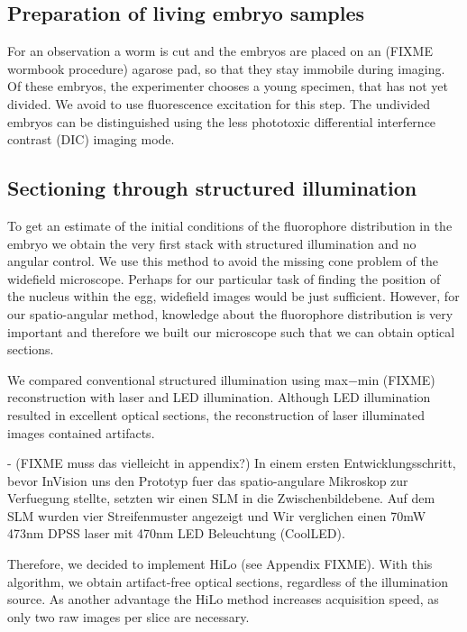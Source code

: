 \subsection{Preparation of living embryo samples} 
For an observation a worm is cut and the embryos are placed on an
(FIXME wormbook procedure) agarose pad, so that they stay immobile
during imaging. Of these embryos, the experimenter chooses a young
specimen, that has not yet divided. We avoid to use fluorescence
excitation for this step.  The undivided embryos can be distinguished
using the less phototoxic differential interfernce contrast (DIC)
imaging mode.

\subsection{Sectioning through structured illumination} 
To get an estimate of the initial conditions of the fluorophore
distribution in the embryo we obtain the very first stack with
structured illumination and no angular control. We use this method to
avoid the missing cone problem of the widefield microscope. Perhaps
for our particular task of finding the position of the nucleus within
the egg, widefield images would be just sufficient.  However, for our
spatio-angular method, knowledge about the fluorophore distribution is
very important and therefore we built our microscope such that we can
obtain optical sections.

We compared conventional structured illumination using max$-$min
(FIXME) reconstruction with laser and LED illumination. Although LED
illumination resulted in excellent optical sections, the
reconstruction of laser illuminated images contained artifacts.

{\color{red} - (FIXME muss das vielleicht in appendix?) In einem
ersten Entwicklungsschritt, bevor InVision uns den Prototyp fuer das
spatio-angulare Mikroskop zur Verfuegung stellte, setzten wir einen
SLM in die Zwischenbildebene. Auf dem SLM wurden vier Streifenmuster
angezeigt und Wir verglichen einen 70mW 473nm DPSS laser mit 470nm LED
Beleuchtung (CoolLED).}

Therefore, we decided to implement HiLo (see Appendix FIXME). With
this algorithm, we obtain artifact-free optical sections, regardless
of the illumination source. As another advantage the HiLo method
increases acquisition speed, as only two raw images per slice are
necessary.



